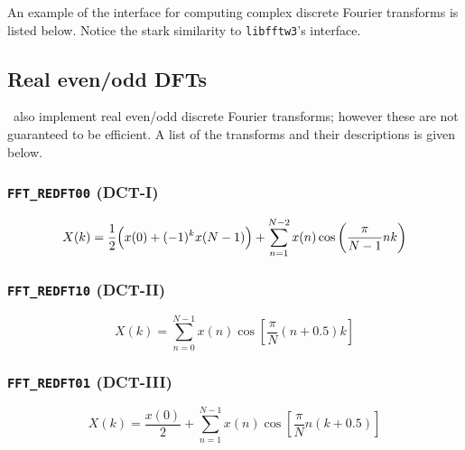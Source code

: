 An example of the interface for computing complex discrete Fourier
transforms is listed below.
Notice the stark similarity to {\tt libfftw3}'s interface.
%

%

\subsection{Real even/odd DFTs}
\label{module:fft:r2r}
%
\liquid\ also implement real even/odd discrete Fourier transforms;
however these are not guaranteed to be efficient.
A list of the transforms and their descriptions is given below.
%
\subsubsection{{\tt FFT\_REDFT00} (DCT-I)}
\label{module:fft:r2r:REDFT00}
    \begin{equation}
    \label{eqn:fft:dct-I}
        X(k) = \frac{1}{2}\Bigl( x(0) + (-1)^k x(N-1) \Bigr) + 
               \sum_{n=1}^{N-2}{x(n) \cos\left(\frac{\pi}{N-1}nk\right) }
    \end{equation}

\subsubsection{{\tt FFT\_REDFT10} (DCT-II)}
\label{module:fft:r2r:REDFT10}
    \begin{equation}
    \label{eqn:fft:dct-II}
        X(k) =  \sum_{n=0}^{N-1}{
                    x(n) \cos\left[
                        \frac{\pi}{N}\left(n + 0.5\right)k
                    \right]
                }
    \end{equation}

\subsubsection{{\tt FFT\_REDFT01} (DCT-III)}
\label{module:fft:r2r:REDFT01}
    \begin{equation}
    \label{eqn:fft:dct-III}
        X(k) =  \frac{x(0)}{2} +
                \sum_{n=1}^{N-1}{
                    x(n) \cos\left[
                        \frac{\pi}{N}n\left(k + 0.5\right)
                    \right]
                }
    \end{equation}


